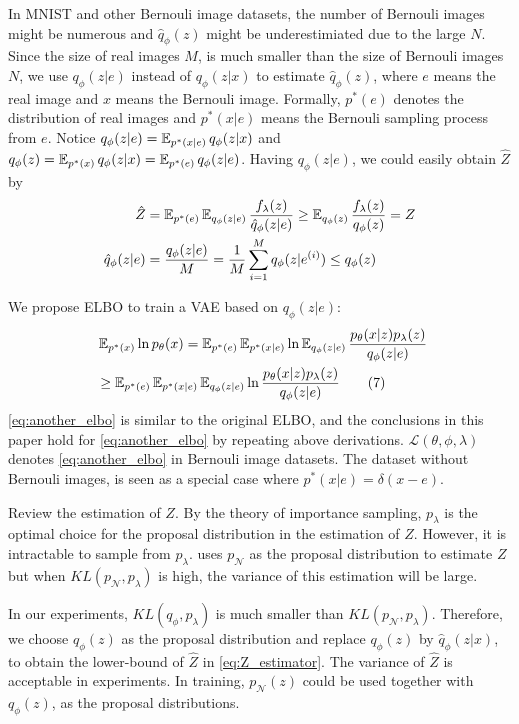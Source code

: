 In MNIST and other Bernouli image datasets, the number of Bernouli images might be numerous and $\hat{q}_\phi(z)$ might be underestimiated due to the large $N$. 
Since the size of real images $M$, is much smaller than the size of Bernouli images $N$, we use $q_\phi(z|e)$ instead of $q_\phi(z|x)$ to estimate $\hat{q}_\phi(z)$, where $e$ means the real image and $x$ means the Bernouli image. 
Formally, $p^*(e)$ denotes the distribution of real images and $p^*(x|e)$ means the Bernouli sampling process from $e$. Notice $q_\phi(z|e) = \operatorname{\mathbb{E}}_{p^*(x|e)} q_\phi(z|x)$ and $q_\phi(z) = \operatorname{\mathbb{E}}_{p^*(x)} q_\phi(z|x) = \operatorname{\mathbb{E}}_{p^*(e)} q_\phi(z|e)$. 
Having $q_\phi(z|e)$, we could easily obtain $\hat{Z}$ by 
\begin{align*}
	\hat{Z} &= \operatorname{\mathbb{E}}_{p^*(e)} \operatorname{\mathbb{E}}_{q_\phi(z|e)} \frac{f_\lambda(z)}{\hat{q}_\phi(z|e)} \geq \operatorname{\mathbb{E}}_{q_\phi(z)} \frac{f_\lambda(z)}{q_\phi(z)} = Z \\
	\hat{q}_\phi(z|e) &= \frac{q_\phi(z|e)}{M} = \frac{1}{M}\sum_{i=1}^M q_\phi(z|e^{(i)}) \leq q_\phi(z)
\end{align*}  

We propose ELBO to train a VAE based on $q_\phi(z|e)$:
\begin{align*}~\label{eq:another_elbo}
	&\E_{p^*(x)} \ln p_\theta(x) = \E_{p^*(e)} \E_{p^*(x|e)} \ln \E_{q_\phi(z|e)} \frac{p_\theta(x|z)p_\lambda(z)}{q_\phi(z|e)} \\
	 &\geq \E_{p^*(e)} \E_{p^*(x|e)} \E_{q_\phi(z|e)} \ln \frac{p_\theta(x|z)p_\lambda(z)}{q_\phi(z|e)} \tag{7} %
\end{align*} 
\cref{eq:another_elbo} is similar to the original ELBO, and the conclusions in this paper hold for \cref{eq:another_elbo} by repeating above derivations. $\mathcal{L}(\theta, \phi, \lambda)$ denotes \cref{eq:another_elbo} in Bernouli image datasets.  %
The dataset without Bernouli images, is seen as a special case where $p^*(x|e) = \delta(x - e)$. 

Review the estimation of $Z$. By the theory of importance sampling, $p_\lambda$ is the optimal choice for the proposal distribution in the estimation of $Z$. However, it is intractable to sample from $p_\lambda$. 
\cite{bauer2019resampled} uses $p_\mathcal{N}$ as the proposal distribution to estimate $Z$ but when $KL(p_\mathcal{N}, p_\lambda)$ is high, the variance of this estimation will be large. 

In our experiments, $KL(q_\phi, p_\lambda)$ is much smaller than $KL(p_\mathcal{N}, p_\lambda)$. Therefore, we choose $q_\phi(z)$ as the proposal distribution and replace $q_\phi(z)$ by $\hat{q}_\phi(z|x)$, to obtain the lower-bound of $\hat{Z}$ in \cref{eq:Z_estimator}. The variance of $\hat{Z}$ is acceptable in experiments.  
In training, $p_\mathcal{N}(z)$ could be used together with $q_\phi(z)$, as the proposal distributions.
 